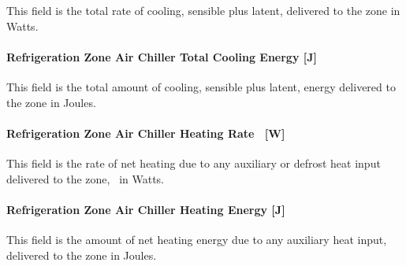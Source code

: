 This field is the total rate of cooling, sensible plus latent, delivered to the zone in Watts.

\paragraph{Refrigeration Zone Air Chiller Total Cooling Energy {[}J{]}}\label{refrigeration-zone-air-chiller-total-cooling-energy-j-1}

This field is the total amount of cooling, sensible plus latent, energy delivered to the zone in Joules.

\paragraph{Refrigeration Zone Air Chiller Heating Rate~ {[}W{]}}\label{refrigeration-zone-air-chiller-heating-rate-w-1}

This field is the rate of net heating due to any auxiliary or defrost heat input delivered to the zone,~ in Watts.

\paragraph{Refrigeration Zone Air Chiller Heating Energy {[}J{]}}\label{refrigeration-zone-air-chiller-heating-energy-j}

This field is the amount of net heating energy due to any auxiliary heat input, delivered to the zone in Joules.
